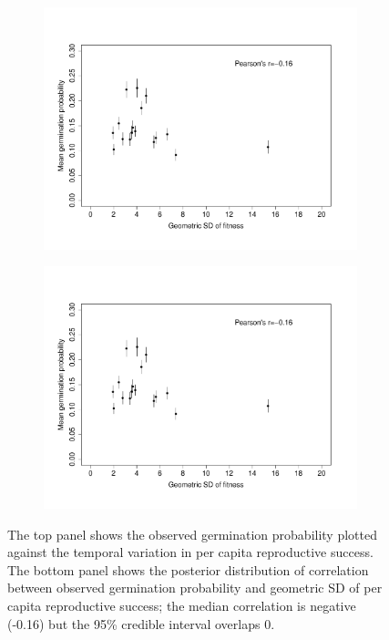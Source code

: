 \documentclass[12pt, oneside, titlepage]{article}   	%
\begin{document}
\iffalse
\begin{figure}
\centering
\begin{subfigure}[h]{.65\textwidth}
\centering
       \includegraphics[page=1,width=1\textwidth]{../figures/germ_rs_correlation.pdf}  
\end{subfigure}
\begin{subfigure}[h]{.9\textwidth}
\centering
       \includegraphics[page=2,width=1\textwidth]{../figures/germ_rs_correlation.pdf}  
\end{subfigure}
 \caption{ The top panel shows the observed germination probability plotted against the temporal variation in per capita reproductive success. The bottom panel shows the posterior distribution of correlation between observed germination probability and geometric SD of per capita reproductive success; the median correlation is negative (-0.16) but the 95\% credible interval overlaps 0. }
   \label{fig:germ_rs_correlation}
 \end{figure}
\end{document}
